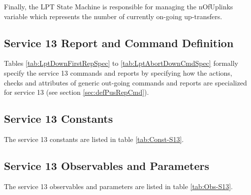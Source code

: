 \documentclass{pnp_article}
\begin{document}
Finally, the LPT State Machine is responsible for managing the nOfUplinks variable which represents the number of currently on-going up-transfers.


\subsection{Service 13 Report and Command Definition}\label{sec:serv13RepCmdDef}
Tables \ref{tab:LptDownFirstRepSpec} to \ref{tab:LptAbortDownCmdSpec} formally specify the service 13 commands and reports by specifying how the actions, checks and attributes of generic out-going commands and reports are specialized for service 13 (see section \ref{sec:defPusRepCmd}). 


\newpage
{}

\newpage
{}

\newpage
{}

\newpage
{}




\newpage
\subsection{Service 13 Constants}\label{sec:serv13Const}
The service 13 constants are listed in table \ref{tab:Const-S13}. 



\subsection{Service 13 Observables and Parameters}\label{sec:serv13Obs}
The service 13 observables and parameters are listed in table \ref{tab:Obs-S13}.
\end{document}
